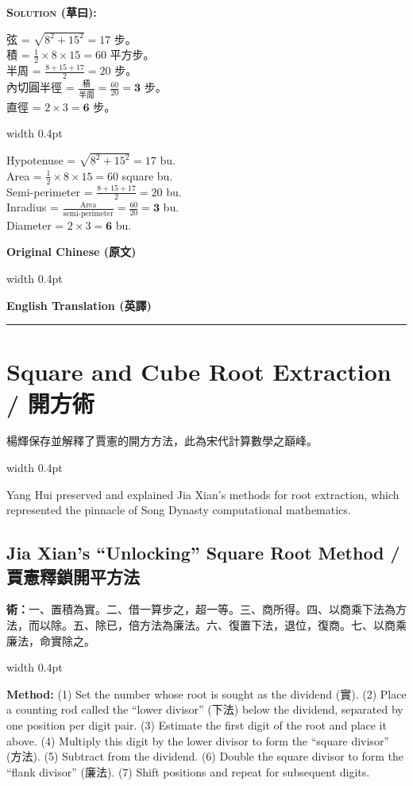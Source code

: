 \documentclass[10pt,a4paper]{article}
\newcommand{\zh}[1]{{\CJKfamily{notocjksc}#1}}
\newcommand{\bilingual}[2]{%
  \par\smallskip\noindent%
  \begin{minipage}[t]{0.47\textwidth}%
    \RaggedRight\small #1%
  \end{minipage}%
  \hfill\vrule width 0.4pt\hfill%
  \begin{minipage}[t]{0.47\textwidth}%
    \RaggedRight\small #2%
  \end{minipage}%
  \par\smallskip%
}
\newenvironment{bisolution}{%
  \par\smallskip\noindent\textbf{\textcolor{notecolor}{\textsc{Solution} (草曰):}}\par\smallskip\itshape\small%
}{%
  \par\smallskip\normalfont%
}
\newcommand{\colheaders}{%
  \noindent
  \begin{minipage}[t]{0.47\textwidth}%
    \centering\textbf{\small\color{sectioncolor}Original Chinese (原文)}%
  \end{minipage}%
  \hfill\vrule width 0.4pt\hfill
  \begin{minipage}[t]{0.47\textwidth}%
    \centering\textbf{\small\color{sectioncolor}English Translation (英譯)}%
  \end{minipage}%
  \par\vspace{0.5em}%
  \noindent\rule{\textwidth}{0.6pt}\par\vspace{0.5em}%
}
\begin{document}
\begin{bisolution}
\bilingual{
  弦 = $\sqrt{8^2 + 15^2} = 17$ 步。\\
  積 = $\frac{1}{2} \times 8 \times 15 = 60$ 平方步。\\
  半周 = $\frac{8 + 15 + 17}{2} = 20$ 步。\\
  內切圓半徑 = $\frac{\text{積}}{\text{半周}} = \frac{60}{20} = \textbf{3}$ 步。\\
  直徑 = $2 \times 3 = \textbf{6}$ 步。
}{%
  Hypotenuse = $\sqrt{8^2 + 15^2} = 17$ bu.\\
  Area = $\frac{1}{2} \times 8 \times 15 = 60$ square bu.\\
  Semi-perimeter = $\frac{8 + 15 + 17}{2} = 20$ bu.\\
  Inradius = $\frac{\text{Area}}{\text{semi-perimeter}} = \frac{60}{20} = \textbf{3}$ bu.\\
  Diameter = $2 \times 3 = \textbf{6}$ bu.
}
\end{bisolution}

\newpage
\colheaders

\section{Square and Cube Root Extraction / 開方術}

\bilingual{
  楊輝保存並解釋了賈憲的開方方法，此為宋代計算數學之巔峰。
}{%
  Yang Hui preserved and explained Jia Xian's methods for root extraction, which represented the pinnacle of Song Dynasty computational mathematics.
}

\subsection{Jia Xian's ``Unlocking'' Square Root Method / 賈憲釋鎖開平方法}

\bilingual{
  \textbf{術：}一、置積為實。二、借一算步之，超一等。三、商所得。四、以商乘下法為方法，而以除。五、除已，倍方法為廉法。六、復置下法，退位，復商。七、以商乘廉法，命實除之。
}{%
  \textbf{Method:} (1) Set the number whose root is sought as the dividend (\zh{實}). (2) Place a counting rod called the ``lower divisor'' (\zh{下法}) below the dividend, separated by one position per digit pair. (3) Estimate the first digit of the root and place it above. (4) Multiply this digit by the lower divisor to form the ``square divisor'' (\zh{方法}). (5) Subtract from the dividend. (6) Double the square divisor to form the ``flank divisor'' (\zh{廉法}). (7) Shift positions and repeat for subsequent digits.
}
\end{document}
